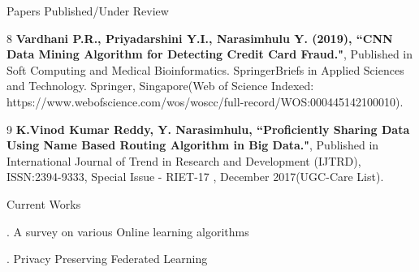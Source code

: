 \documentclass{resume} %
\begin{document}
\begin{rSection}{Papers Published/Under Review}
\begin{rSubsection}{}{}{}{}
		\item[8] \textbf{Vardhani P.R., Priyadarshini Y.I., Narasimhulu Y. (2019), ``CNN Data Mining Algorithm for Detecting Credit Card Fraud."}, Published in Soft Computing and Medical Bioinformatics. SpringerBriefs in Applied Sciences and Technology. Springer, Singapore(Web of Science Indexed: https://www.webofscience.com/wos/woscc/full-record/WOS:000445142100010).
		
		\item[9] \textbf{K.Vinod Kumar Reddy, Y. Narasimhulu, ``Proficiently Sharing Data Using Name Based Routing Algorithm in Big Data."}, Published in International Journal of Trend in Research and Development (IJTRD), ISSN:2394-9333, Special Issue - RIET-17 , December 2017(UGC-Care List).
	\end{rSubsection}
	
	
\end{rSection}

\begin{rSection}{Current Works}
	
	\begin{rSubsection}{}{}{}{}	
		\item[.] A survey on various Online learning algorithms
		\item[.] Privacy Preserving Federated Learning
	\end{rSubsection}
\end{rSection}
\end{document}
